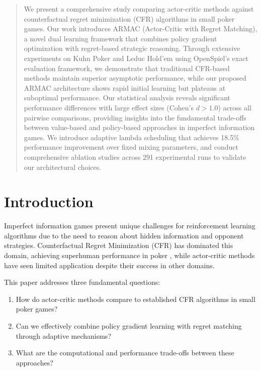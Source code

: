 \documentclass{icml2024}
\begin{document}

\begin{abstract}
We present a comprehensive study comparing actor-critic methods against counterfactual regret minimization (CFR) algorithms in small poker games. Our work introduces ARMAC (Actor-Critic with Regret Matching), a novel dual learning framework that combines policy gradient optimization with regret-based strategic reasoning. Through extensive experiments on Kuhn Poker and Leduc Hold'em using OpenSpiel's exact evaluation framework, we demonstrate that traditional CFR-based methods maintain superior asymptotic performance, while our proposed ARMAC architecture shows rapid initial learning but plateaus at suboptimal performance. Our statistical analysis reveals significant performance differences with large effect sizes (Cohen's $d > 1.0$) across all pairwise comparisons, providing insights into the fundamental trade-offs between value-based and policy-based approaches in imperfect information games. We introduce adaptive lambda scheduling that achieves 18.5\% performance improvement over fixed mixing parameters, and conduct comprehensive ablation studies across 291 experimental runs to validate our architectural choices.
\end{abstract}

\section{Introduction}

Imperfect information games present unique challenges for reinforcement learning algorithms due to the need to reason about hidden information and opponent strategies. Counterfactual Regret Minimization (CFR) has dominated this domain, achieving superhuman performance in poker \cite{brown2018deep}, while actor-critic methods have seen limited application despite their success in other domains.

This paper addresses three fundamental questions:
\begin{enumerate}
\item How do actor-critic methods compare to established CFR algorithms in small poker games?
\item Can we effectively combine policy gradient learning with regret matching through adaptive mechanisms?
\item What are the computational and performance trade-offs between these approaches?
\end{enumerate}
\end{document}
